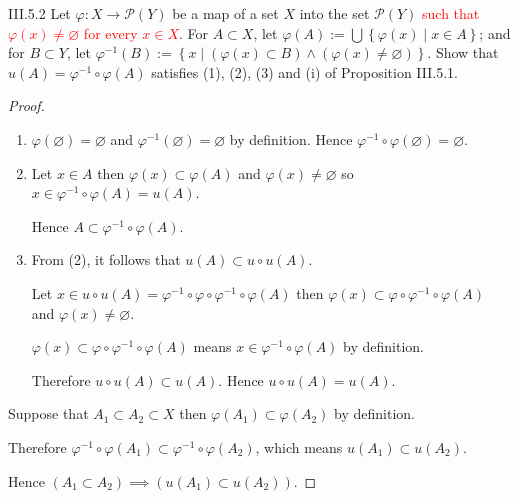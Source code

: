 \begin{problem}{III.5.2}
Let \( \varphi: X \to \mathscr{P}(Y) \) be a map of a set \(X\) into the set \( \mathscr{P}(Y) \) \textcolor{red}{such that \( \varphi(x) \ne \varnothing \) for every \( x \in X \)}. For \( A \subset X \), let \( \varphi(A) := \bigcup \left\{ \varphi(x) \mid x \in A \right\} \); and for \( B \subset Y \), let \( \varphi^{-1}(B) := \left\{ x \mid (\varphi(x) \subset B) \land (\varphi(x) \ne \varnothing) \right\} \). Show that \( u(A) = \varphi^{-1}\circ\varphi(A) \) satisfies (1), (2), (3) and (i) of Proposition III.5.1.
\end{problem}

\begin{proof}
	\begin{enumerate}[label={(\arabic*)}]
		\item \( \varphi(\varnothing) = \varnothing \) and \( \varphi^{-1}(\varnothing) = \varnothing \) by definition. Hence \( \varphi^{-1} \circ \varphi(\varnothing) = \varnothing \).
		\item Let \( x \in A \) then \( \varphi(x) \subset \varphi(A) \) and \( \varphi(x) \ne \varnothing \) so \( x \in \varphi^{-1}\circ \varphi(A) = u(A) \).

		      Hence \( A \subset \varphi^{-1} \circ \varphi(A) \).
		\item From (2), it follows that \( u(A) \subset u \circ u(A) \).

		      Let \( x \in u \circ u(A) = \varphi^{-1} \circ \varphi \circ \varphi^{-1} \circ \varphi(A) \) then \( \varphi(x) \subset \varphi \circ \varphi^{-1} \circ \varphi(A) \) and \( \varphi(x) \ne \varnothing \).

		      \( \varphi(x) \subset \varphi \circ \varphi^{-1} \circ \varphi(A) \) means \( x \in \varphi^{-1} \circ \varphi(A) \) by definition.

		      Therefore \( u \circ u(A) \subset u(A) \). Hence \( u \circ u(A) = u(A) \).
	\end{enumerate}

	Suppose that \( A_{1} \subset A_{2} \subset X \) then \( \varphi(A_{1}) \subset \varphi(A_{2}) \) by definition.

	Therefore \( \varphi^{-1} \circ \varphi(A_{1}) \subset \varphi^{-1} \circ \varphi(A_{2}) \), which means \( u(A_{1}) \subset u(A_{2}) \).

	Hence \( (A_{1} \subset A_{2}) \implies (u(A_{1}) \subset u(A_{2})) \).
\end{proof}

